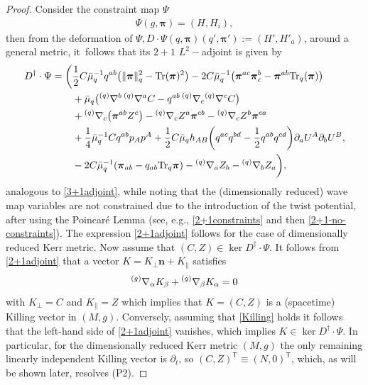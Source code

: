 \documentclass[pdftex]{sigma}
\def\ptl{\partial}%
\def\mbo#1{\boldsymbol{#1}}%
\def\grad{{\nabla}}%
\newcommand{\leftexp}[2]{{\vphantom{#2}}^{#1}{#2}}
\def\halb{\frac{1}{2}}%
\def \a{\alpha}
\def \b {\beta}
\renewcommand{\a}{\alpha}
\renewcommand{\b}{\beta}
\numberwithin{equation}{section}
\begin{document}
\begin{proof}
Consider the constraint map $\Psi$
\begin{align*}
\Psi (g, \mbo{\pi}) = (H, H_i),
\end{align*}
then from the deformation of $\Psi, D \cdot \Psi (q, \mbo{\pi}) (q', \mbo{\pi}') := (H', H'_a)$, around a general metric,
it~follows that its $2+1$ $L^2-$adjoint is given by
\begin{align*} %
D^{\dagger} \cdot \Psi= \biggl(&\halb C \bar{\mu}^{-1}_q q^{ab} \bigl(\Vert \mbo{\pi} \Vert^2_q - {\rm Tr}(\mbo{\pi})^2\bigr)- 2C \bar{\mu}^{-1}_q \bigl( \mbo{\pi}^{ac} \mbo{\pi}^{b}_c - \mbo{\pi}^{ab} {\rm Tr}_q(\mbo{\pi}) \bigr) \notag\\
&{}+\bar{\mu}_q \bigl(\leftexp{(q)}{\grad}^b \,\leftexp{(q)}{\grad}^a C -q^{ab}\, \leftexp{(q)}{\grad}_c \leftexp{(q)}{\grad}^c C\bigr) \notag\\
&{}+ \leftexp{(q)}{\grad}_c\bigl(\mbo{\pi}^{ab} Z^c\bigr) - \leftexp{(q)}{\grad}_c Z^a \mbo{\pi}^{cb} - \leftexp{(q)}{\grad}_c Z^b \mbo{\pi}^{ca}\notag\\
&{}+ \frac{1}{4}\bar{\mu}_q^{-1} C q^{ab} p_A p^A + \halb C \bar{\mu}_q h_{AB} \biggl(q^{ac}q^{bd} - \halb q^{ab} q^{cd}\biggr)\ptl_a U^A \ptl_b U^B, \notag\\
&{} -2C \bar{\mu}^{-1}_q (\mbo{\pi}_{ab} - q_{ab} {\rm Tr}_q \mbo{\pi}) - \leftexp{(q)}{\grad}_a Z_b - \leftexp{(q)}{\grad}_b Z_a\biggr),
\end{align*}
analogous to \eqref{3+1adjoint}, while noting that the (dimensionally reduced) wave map variables are not constrained due to the introduction of the twist potential, after using the Poincar\'e Lemma (see, e.g., \eqref{2+1constraints} and then \eqref{2+1-no-constraints}). The expression \eqref{2+1adjoint} follows for the case of dimensionally reduced Kerr metric.
Now assume that $(C, Z) \in \operatorname{ker} D^\dagger \cdot \Psi$. It follows from \eqref{2+1adjoint} that a vector $K = K_{\perp} \mbo{n} + K_{\parallel} $
satisfies
\begin{align}\label{Killing}
\leftexp{(g)}{\grad}_\a K_\b + \leftexp{(g)}{\grad}_\b K_\a =0
\end{align}
with $K_{\perp} = C$ and $K_{\parallel} = Z$
which implies that $K = (C, Z)$ is a (spacetime) Killing vector in $(M, g)$. Conversely, assuming that \eqref{Killing} holds
it follows that the left-hand side of \eqref{2+1adjoint} vanishes, which implies $K \in \operatorname{ker} D^\dagger \cdot \Psi$. In particular, for the dimensionally reduced Kerr metric $(M,g)$ the only remaining linearly independent Killing vector is $\ptl_t$, so $(C, Z)^{\mathsf{T}} \equiv (N, 0)^{\mathsf{T}}$, which, as will be shown later, resolves (P2).
\end{proof}
\end{document}
